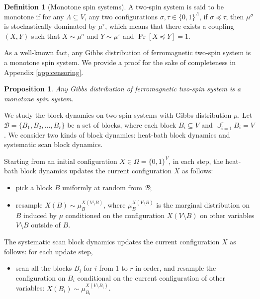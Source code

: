 \documentclass[11pt]{amsart}
\renewcommand{\Pr}{\mathop{\mathrm{Pr}}\nolimits}
\def\+#1{\mathcal{#1}}
\newtheorem{proposition}[theorem]{Proposition}
\theoremstyle{definition}
\newtheorem{definition}[theorem]{Definition}
\theoremstyle{remark}
\begin{document}
\begin{definition}[Monotone spin systems]
 A two-spin system is said to be monotone if for any $\Lambda \subseteq V$, any two configurations $\sigma,\tau \in \{0,1\}^{\Lambda}$, if $\sigma \preceq \tau$, then $\mu^\sigma$ is stochastically dominated by $\mu^\tau$, which means that there exists a coupling $(X,Y)$ such that $X \sim \mu^\sigma$ and $Y \sim \mu^\tau$ and $\Pr[X \preceq Y] = 1$.
\end{definition}

As a well-known fact, any Gibbs distribution of ferromagnetic two-spin system is a monotone spin system. We provide a proof for the sake of completeness in Appendix \ref{app:censoring}.
\begin{proposition}\label{prop:monotone-of-ferro-ising}
    Any Gibbs distribution of ferromagnetic two-spin system is a monotone spin system.
\end{proposition}


We study the block dynamics on two-spin systems with Gibbs distribution $\mu$. Let $\+B = \{B_1,B_2,\ldots,B_r\}$ be a set of blocks, where each block $B_i \subseteq V$ and $\cup_{i=1}^r B_i = V$. 
We consider two kinds of block dynamics: heat-bath block dynamics and systematic scan block dynamics. 

Starting from an initial configuration $X\in \Omega = \{0,1\}^V$, in each step, the heat-bath block dynamics updates the current configuration $X$ as follows:
\begin{itemize}
    \item pick a block $B$ uniformly at random from $\+B$;
    \item resample $X(B)\sim \mu_{B}^{X(V \setminus B)}$, where $\mu_{B}^{X(V \setminus B)}$ is the marginal distribution on $B$ induced by $\mu$ conditioned on the configuration $X(V \setminus B)$ on other variables $V \setminus B$ outside of $B$.
\end{itemize}
The systematic scan block dynamics updates the current configuration $X$ as follows: for each update step,
\begin{itemize}
  \item scan all the blocks $B_i$ for $i$ from 1 to $r$ in order, and resample the configuration on $B_i$ conditional on the current configuration of other variables: $X(B_i) \sim \mu_{B_i}^{X(V \setminus B_i)}$.
\end{itemize}
\end{document}
